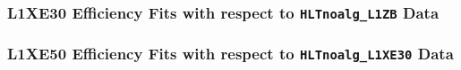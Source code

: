 \documentclass[draft]{beamer}
\begin{document}
\begin{frame}
        \frametitle{L1XE30 Efficiency Fits with respect to \texttt{HLTnoalg\_L1ZB} Data}
\end{frame}
\begin{frame}
        \frametitle{L1XE50 Efficiency Fits with respect to \texttt{HLTnoalg\_L1XE30} Data}
\end{frame}
\begin{frame}

\end{frame}
\end{document}
